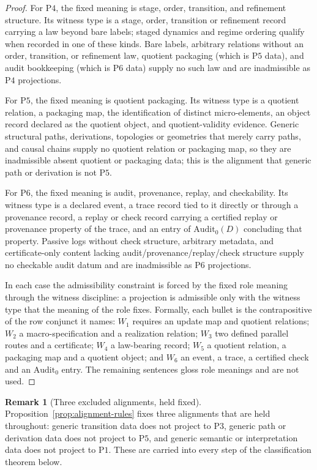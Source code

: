 \documentclass[11pt]{article}
\theoremstyle{definition}
\newtheorem{remark}[theorem]{Remark}
\newcommand{\Pone}{\ensuremath{\mathrm{P1}}}
\newcommand{\Pthree}{\ensuremath{\mathrm{P3}}}
\newcommand{\Pfour}{\ensuremath{\mathrm{P4}}}
\newcommand{\Pfive}{\ensuremath{\mathrm{P5}}}
\newcommand{\Psix}{\ensuremath{\mathrm{P6}}}
\begin{document}
\begin{proof}
For \Pfour{}, the fixed meaning is stage, order, transition, and
refinement structure. Its witness type is a stage, order, transition or
refinement record carrying a law beyond bare labels; staged dynamics and
regime ordering qualify when recorded in one of these kinds. Bare labels, arbitrary relations without an order,
transition, or refinement law, quotient packaging (which is \Pfive{}
data), and audit bookkeeping (which is \Psix{} data) supply no such law
and are inadmissible as \Pfour{} projections.

For \Pfive{}, the fixed meaning is quotient packaging. Its witness type
is a quotient relation, a packaging map, the identification of distinct
micro-elements, an object record declared as the quotient object, and
quotient-validity evidence. Generic structural paths, derivations,
topologies or geometries that merely carry paths, and causal chains
supply no quotient relation or packaging map, so they are inadmissible
absent quotient or packaging data; this is the alignment that
generic path or derivation is not \Pfive{}.

For \Psix{}, the fixed meaning is audit, provenance, replay, and
checkability. Its witness type is a declared event, a trace record tied to it directly or through a provenance record, a replay or check record carrying a certified replay or provenance property of the trace, and an entry of \(\mathrm{Audit}_0(D)\) concluding that property. Passive logs without check
structure, arbitrary metadata, and certificate-only content lacking
audit/provenance/replay/check structure supply no checkable audit datum
and are inadmissible as \Psix{} projections.

In each case the admissibility constraint is forced by the fixed role
meaning through the witness discipline: a projection is admissible only
with the witness type that the meaning of the role fixes. Formally, each
bullet is the contrapositive of the row conjunct it names: \(W_1\) requires an
update map and quotient relations; \(W_2\) a macro-specification and a
realization relation; \(W_3\) two defined parallel routes and a certificate;
\(W_4\) a law-bearing record; \(W_5\) a quotient relation, a packaging map and a
quotient object; and \(W_6\) an event, a trace, a certified check and an
\(\mathrm{Audit}_0\) entry. The remaining sentences gloss role meanings and are
not used.
\end{proof}

\begin{remark}[Three excluded alignments, held fixed]\label{rem:three-repaired-alignments}
Proposition~\ref{prop:alignment-rules} fixes three alignments that
are held throughout: generic transition data does not project to
\Pthree{}, generic path or derivation data does not project to
\Pfive{}, and generic semantic or interpretation data does not project
to \Pone{}. These are carried into every step of the classification
theorem below.
\end{remark}
\end{document}
